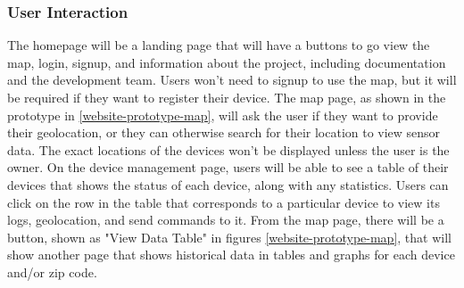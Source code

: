 \subsubsection{User Interaction}
The homepage will be a landing page that will have a buttons to go view the map, login, signup, and
information about the project, including documentation and the development team. Users won't need to
signup to use the map, but it will be required if they want to register their device. The map page,
as shown in the prototype in \ref{website-prototype-map}, will ask the user if they want to provide
their geolocation, or they can otherwise search for their location to view sensor data. The exact
locations of the devices won't be displayed unless the user is the owner. On the device management
page, users will be able to see a table of their devices that shows the status of each device, along
with any statistics. Users can click on the row in the table that corresponds to a particular
device to view its logs, geolocation, and send commands to it. From the map page, there will be
a button, shown as "View Data Table" in figures \ref{website-prototype-map}, that will show another
page that shows historical data in tables and graphs for each device and/or zip code.
